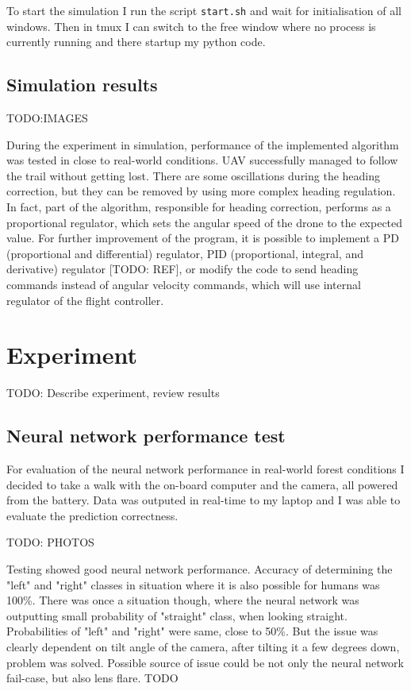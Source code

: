To start the simulation I run the script \texttt{start.sh} and wait for initialisation of all windows. Then in tmux I can switch to the free window where no process is currently running and there startup my python code. 

\section{Simulation results}

TODO:IMAGES

During the experiment in simulation, performance of the implemented algorithm was tested in close to real-world conditions. UAV successfully managed to follow the trail without getting lost. There are some oscillations during the heading correction, but they can be removed by using more complex heading regulation. In fact, part of the algorithm, responsible for heading correction, performs as a proportional regulator, which sets the angular speed of the drone to the expected value. For further improvement of the program, it is possible to implement a PD (proportional and differential) regulator, PID (proportional, integral, and derivative) regulator [TODO: REF], or modify the code to send heading commands instead of angular velocity commands, which will use internal regulator of the flight controller.









\chapter{Experiment}

TODO: Describe experiment, review results

\section{Neural network performance test}

For evaluation of the neural network performance in real-world forest conditions I decided to take a walk with the on-board computer and the camera, all powered from  the battery. Data was outputed in real-time to my laptop and I was able to evaluate the prediction correctness. 

TODO: PHOTOS

Testing showed good neural network performance. Accuracy of determining the "left" and "right" classes in situation where it is also possible for humans was 100\%. There was once a situation though, where the neural network was outputting small probability of "straight" class, when looking straight. Probabilities of "left" and "right" were same, close to 50\%. But the issue was clearly dependent on tilt angle of the camera, after tilting it a few degrees down, problem was solved. Possible source of issue could be not only the neural network fail-case, but also lens flare. TODO

